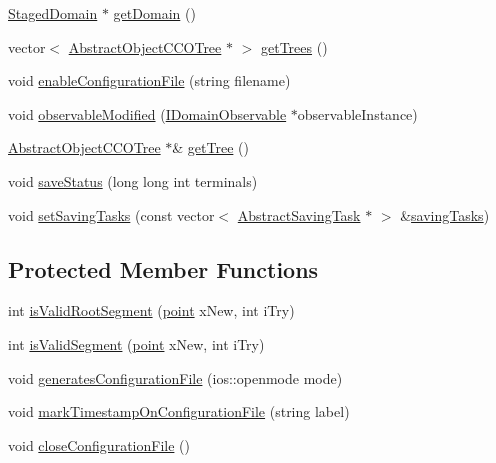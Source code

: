 \begin{DoxyCompactItemize}
\item 
\hyperlink{class_staged_domain}{Staged\+Domain} $\ast$ \hyperlink{class_staged_f_r_r_o_tree_generator_adac14b11b09b21df02d635ed124216a7}{get\+Domain} ()
\item 
vector$<$ \hyperlink{class_abstract_object_c_c_o_tree}{Abstract\+Object\+C\+C\+O\+Tree} $\ast$ $>$ \hyperlink{class_staged_f_r_r_o_tree_generator_a3aeb9dd5215d1103fe2c686c86967f54}{get\+Trees} ()
\item 
void \hyperlink{class_staged_f_r_r_o_tree_generator_a878038a908e5a3ac9433f570ebd8b4ae}{enable\+Configuration\+File} (string filename)
\item 
void \hyperlink{class_staged_f_r_r_o_tree_generator_a01a80f2720de4fe42b47dd9eb98a25bd}{observable\+Modified} (\hyperlink{class_i_domain_observable}{I\+Domain\+Observable} $\ast$observable\+Instance)
\item 
\hyperlink{class_abstract_object_c_c_o_tree}{Abstract\+Object\+C\+C\+O\+Tree} $\ast$\& \hyperlink{class_staged_f_r_r_o_tree_generator_a2332bdf2a9edb5f4739e7379536eb632}{get\+Tree} ()
\item 
void \hyperlink{class_staged_f_r_r_o_tree_generator_abfdedad4fd436cd56ecbe4d134ee93a8}{save\+Status} (long long int terminals)
\item 
void \hyperlink{class_staged_f_r_r_o_tree_generator_abbbee9a209eec78d5631b1842a3e50fc}{set\+Saving\+Tasks} (const vector$<$ \hyperlink{class_abstract_saving_task}{Abstract\+Saving\+Task} $\ast$ $>$ \&\hyperlink{class_staged_f_r_r_o_tree_generator_a8e44b058bac0e695c3956dee14ca36c2}{saving\+Tasks})
\end{DoxyCompactItemize}
\subsection*{Protected Member Functions}
\begin{DoxyCompactItemize}
\item 
int \hyperlink{class_staged_f_r_r_o_tree_generator_aa9672ad3756b4c4bddc91d8e59481f38}{is\+Valid\+Root\+Segment} (\hyperlink{structpoint}{point} x\+New, int i\+Try)
\item 
int \hyperlink{class_staged_f_r_r_o_tree_generator_ae357cc09a7e74d802d3155f096cbb21f}{is\+Valid\+Segment} (\hyperlink{structpoint}{point} x\+New, int i\+Try)
\item 
void \hyperlink{class_staged_f_r_r_o_tree_generator_a7ed8117f7d652c426e28d0444b87378c}{generates\+Configuration\+File} (ios\+::openmode mode)
\item 
void \hyperlink{class_staged_f_r_r_o_tree_generator_ad3f04c8a35843fed669191118d4498d6}{mark\+Timestamp\+On\+Configuration\+File} (string label)
\item 
void \hyperlink{class_staged_f_r_r_o_tree_generator_ab431406dedabb57e0ea6274797aa7dd7}{close\+Configuration\+File} ()
\end{DoxyCompactItemize}
